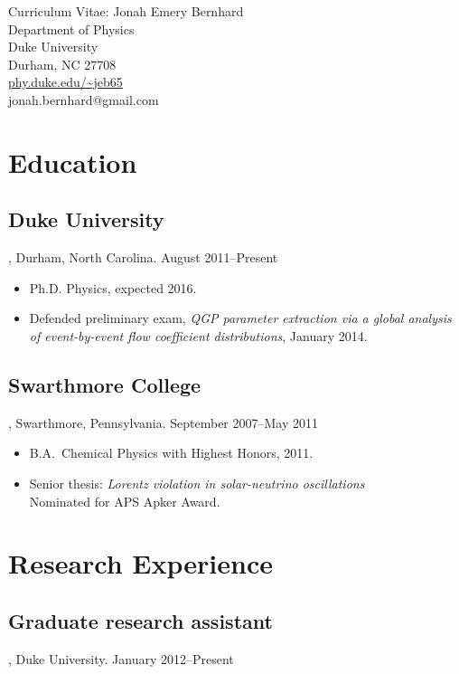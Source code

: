 \documentclass[letterpaper,10pt]{article}
\begin{document}
\begin{center}
  \Large
  Curriculum Vitae:  Jonah Emery Bernhard \\[1ex]
  \normalsize\rm
  Department of Physics \\
  Duke University \\
  Durham, NC 27708 \\[.5ex]
  \url{phy.duke.edu/~jeb65} \\
  jonah.bernhard@gmail.com
\end{center}


\section{Education}


\subsection{Duke University}, Durham, North Carolina. \hfill August 2011--Present

\begin{itemize}
  \item Ph.D. Physics, expected 2016.
  \item Defended preliminary exam, \emph{QGP parameter extraction via a global analysis of event-by-event flow coefficient distributions}, January 2014.
\end{itemize}


\subsection{Swarthmore College}, Swarthmore, Pennsylvania. \hfill September 2007--May 2011

\begin{itemize}
  \item B.A.\ Chemical Physics with Highest Honors, 2011.
  \item Senior thesis:  \emph{Lorentz violation in solar-neutrino oscillations} \\
          Nominated for APS Apker Award.
\end{itemize}



\section{Research Experience}


\subsection{Graduate research assistant}, Duke University. \hfill January 2012--Present
\end{document}
